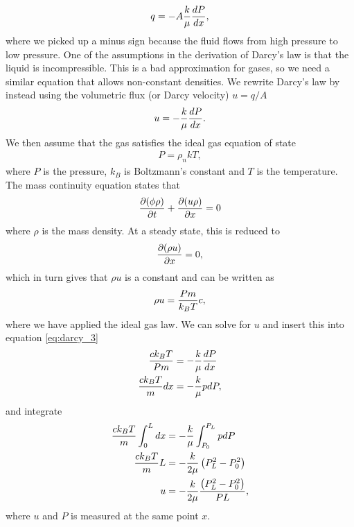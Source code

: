 \begin{align}
\label{eq:darcy_2}
	q = -A{k\over \mu}{dP\over dx},
\end{align}
where we picked up a minus sign because the fluid flows from high pressure to low pressure. One of the assumptions in the derivation of Darcy's law is that the liquid is incompressible.\cite{darcy_derivation} This is a bad approximation for gases, so we need a similar equation that allows non-constant densities. We rewrite Darcy's law by instead using the volumetric flux (or Darcy velocity) $u=q/A$
\begin{align}
	\label{eq:darcy_3}
	u = -{k\over \mu}{dP\over dx}.
\end{align}
We then assume that the gas satisfies the ideal gas equation of state
\begin{align}
	P = \rho_n kT,
\end{align}
where $P$ is the pressure, $k_B$ is Boltzmann's constant and $T$ is the temperature. The mass continuity equation states that
\begin{align}
	\frac{\partial (\phi \rho)}{\partial t} + \frac{\partial (u\rho)}{\partial x} = 0
\end{align}
where $\rho$ is the mass density. At a steady state, this is reduced to
\begin{align}
	\frac{\partial (\rho u)}{\partial x} = 0,
\end{align}
which in turn gives that $\rho u$ is a constant and can be written as
\begin{align}
	\rho u = {Pm\over k_BT} c,
\end{align}
where we have applied the ideal gas law. We can solve for $u$ and insert this into equation \eqref{eq:darcy_3}
\begin{align}
	{ck_BT\over P m} &= -{k\over \mu}{dP\over dx}\\
	{ck_BT\over m}dx &= -{k\over \mu}pdP,
\end{align}
and integrate 
\begin{align}
	{ck_BT\over m}\int_0^L dx &= -{k\over \mu}\int_{P_0}^{P_L} pdP\\
	{ck_BT\over m}L &= -{k\over 2\mu}\left(P_L^2 - P_0^2\right)\\
	u &= -{k\over 2\mu}{\left(P_L^2 - P_0^2\right)\over PL},
\end{align}
where $u$ and $P$ is measured at the same point $x$. 

